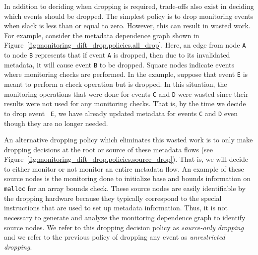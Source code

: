 In addition to deciding when dropping is required, trade-offs also exist in
deciding which events should be dropped.  The simplest policy is to drop
monitoring events when slack is less than or equal to zero.  However, this can
result in wasted work. For example, consider the metadata dependence graph
shown in Figure~\ref{fig:monitoring_dift_drop.policies.all_drop}. Here, an edge
from node {\tt A} to node {\tt B} represents that if event {\tt A} is dropped,
then due to its invalidated metadata, it will cause event {\tt B} to be
dropped. Square nodes indicate events where monitoring checks are performed. In
the example, suppose that event {\tt E} is meant to perform a check operation
but is dropped.  In this situation, the monitoring operations that were done
for events {\tt C} and {\tt D} were wasted since their results were not used
for any monitoring checks.  That is, by the time we decide to drop event {\tt
E}, we have already updated metadata for events {\tt C} and {\tt D} even though
they are no longer needed.

An alternative dropping policy which eliminates this wasted work is to only
make dropping decisions at the root or source of these metadata flows (see
Figure~\ref{fig:monitoring_dift_drop.policies.source_drop}). That is, we will
decide to either monitor or not monitor an entire metadata flow. An example of
these source nodes is the monitoring done to initialize base and bounds
information on {\tt malloc} for an array bounds check. These source nodes are
easily identifiable by the dropping hardware because they typically correspond
to the special instructions that are used to set up metadata information. Thus,
it is not necessary to generate and analyze the monitoring dependence graph to
identify source nodes. We refer to this dropping decision policy as
\emph{source-only dropping} and we refer to the previous policy of dropping any
event as \emph{unrestricted dropping}.

